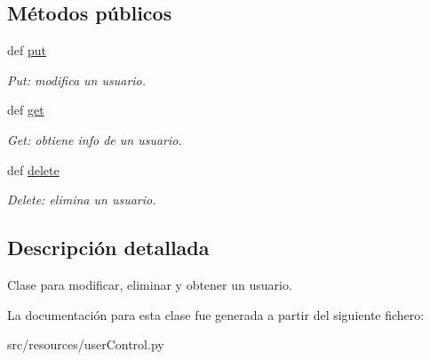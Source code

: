 \subsection*{Métodos públicos}
\begin{DoxyCompactItemize}
\item 
\hypertarget{classsrc_1_1resources_1_1user_control_1_1_user_controller_af3100a3a699d047532e44bf0156af1c8}{def \hyperlink{classsrc_1_1resources_1_1user_control_1_1_user_controller_af3100a3a699d047532e44bf0156af1c8}{put}}\label{classsrc_1_1resources_1_1user_control_1_1_user_controller_af3100a3a699d047532e44bf0156af1c8}

\begin{DoxyCompactList}\small\item\em Put\-: modifica un usuario. \end{DoxyCompactList}\item 
\hypertarget{classsrc_1_1resources_1_1user_control_1_1_user_controller_afc4fd14e1b864baf878d7a731abb75ab}{def \hyperlink{classsrc_1_1resources_1_1user_control_1_1_user_controller_afc4fd14e1b864baf878d7a731abb75ab}{get}}\label{classsrc_1_1resources_1_1user_control_1_1_user_controller_afc4fd14e1b864baf878d7a731abb75ab}

\begin{DoxyCompactList}\small\item\em Get\-: obtiene info de un usuario. \end{DoxyCompactList}\item 
\hypertarget{classsrc_1_1resources_1_1user_control_1_1_user_controller_ac47a7ebe7f6e2791222681665cd7d021}{def \hyperlink{classsrc_1_1resources_1_1user_control_1_1_user_controller_ac47a7ebe7f6e2791222681665cd7d021}{delete}}\label{classsrc_1_1resources_1_1user_control_1_1_user_controller_ac47a7ebe7f6e2791222681665cd7d021}

\begin{DoxyCompactList}\small\item\em Delete\-: elimina un usuario. \end{DoxyCompactList}\end{DoxyCompactItemize}


\subsection{Descripción detallada}
Clase para modificar, eliminar y obtener un usuario. 

La documentación para esta clase fue generada a partir del siguiente fichero\-:\begin{DoxyCompactItemize}
\item 
src/resources/user\-Control.\-py\end{DoxyCompactItemize}
